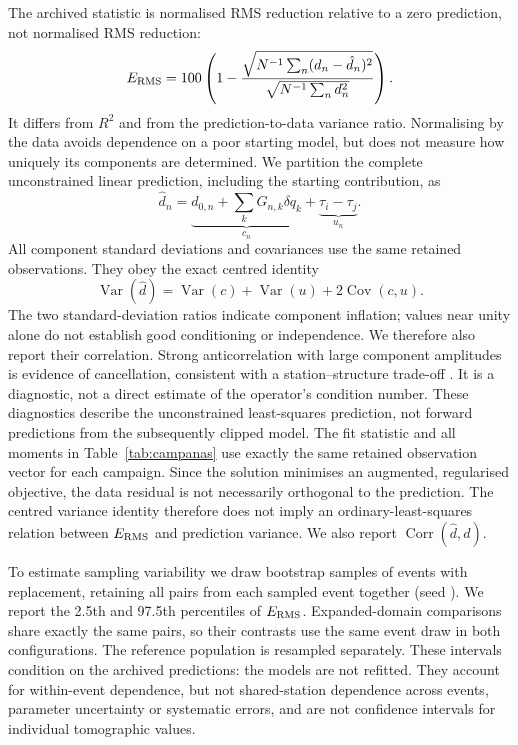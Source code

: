 \documentclass[review,authoryear,longtitle]{elsarticle}
\begin{document}
The archived statistic is normalised RMS reduction relative to a zero
prediction, not normalised RMS reduction:
\begin{equation}
 E_{\rm RMS}=100\left(1-
 \frac{\sqrt{N^{-1}\sum_n(d_n-\hat d_n)^2}}
      {\sqrt{N^{-1}\sum_n d_n^2}}\right).
 \label{eq:nrms}
\end{equation}
It differs from $R^2$ and from the prediction-to-data variance ratio.
Normalising by the data avoids dependence on a poor starting model, but
does not measure how uniquely its components are determined. We partition
the complete unconstrained linear prediction, including the starting
contribution, as
\begin{equation}
 \hat d_n=\underbrace{d_{0,n}+\sum_k G_{n,k}\delta q_k}_{c_n}
       +\underbrace{\tau_i-\tau_j}_{u_n}.
 \label{eq:descomp}
\end{equation}
All component standard deviations and covariances use the same retained
observations. They obey the exact centred identity
\begin{equation}
 \operatorname{Var}(\hat d)=\operatorname{Var}(c)+
 \operatorname{Var}(u)+2\operatorname{Cov}(c,u).
 \label{eq:covariance}
\end{equation}
The two standard-deviation ratios indicate component inflation; values
near unity alone do not establish good conditioning or independence.
We therefore also report their correlation. Strong anticorrelation with
large component amplitudes is evidence of cancellation, consistent with
a station--structure trade-off \citep{Menke2018}. It is a diagnostic,
not a direct estimate of the operator's condition number.
These diagnostics describe the unconstrained least-squares prediction,
not forward predictions from the subsequently clipped model.
The fit statistic and all moments in Table~\ref{tab:campanas} use exactly
the same retained observation vector for each campaign. Since the
solution minimises an augmented, regularised objective, the data residual
is not necessarily orthogonal to the prediction. The centred variance
identity therefore does not imply an ordinary-least-squares relation
between $E_{\rm RMS}$ and prediction variance. We also report
$\operatorname{Corr}(\hat d,d)$.

To estimate sampling variability we draw \auditBootstrapReplicates{}
bootstrap samples of events with replacement, retaining all pairs from
each sampled event together (seed \auditBootstrapSeed). We report the
2.5th and 97.5th percentiles of $E_{\rm RMS}$. Expanded-domain comparisons
share exactly the same pairs, so their contrasts use the same event draw
in both configurations. The reference population is resampled separately.
These intervals condition on the archived predictions: the models are not
refitted. They account for within-event dependence, but not shared-station
dependence across events, parameter uncertainty or systematic errors, and
are not confidence intervals for individual tomographic values.
\end{document}
